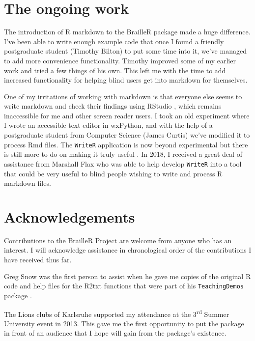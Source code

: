 \documentclass[
]{book}
\begin{document}
\hypertarget{the-ongoing-work}{%
\section{The ongoing work}\label{the-ongoing-work}}

The introduction of R markdown to the BrailleR package made a huge difference.
I've been able to write enough example code that once I found a friendly postgraduate student (Timothy Bilton) to put some time into it, we've managed to add more convenience functionality.
Timothy improved some of my earlier work and tried a few things of his own.
This left me with the time to add increased functionality for helping blind users get into markdown for themselves.

One of my irritations of working with markdown is that everyone else seems to write markdown and check their findings using RStudio \citep{RStudio}, which remains inaccessible for me and other screen reader users. I took an old experiment where I wrote an accessible text editor in wxPython, and with the help of a postgraduate student from Computer Science (James Curtis) we've modified it to process Rmd files.
The \texttt{WriteR} application is now beyond experimental but there is still more to do on making it truly useful \citep{GodfreyCurtis2016WriteRPaper}.
In 2018, I received a great deal of assistance from Marshall Flax who was able to help develop \texttt{WriteR} into a tool that could be very useful to blind people wishing to write and process R markdown files.

\hypertarget{acknowledgements}{%
\section{Acknowledgements}\label{acknowledgements}}

Contributions to the BrailleR Project are welcome from anyone who has an
interest. I will acknowledge assistance in chronological order of the
contributions I have received thus far.

Greg Snow was the first person to assist when he gave me copies of the
original R code and help files for the R2txt functions that were part of
his \texttt{TeachingDemos} package \citep{Rpkg-TeachingDemos}.

The Lions clubs of Karlsruhe supported my attendance at the 3\textsuperscript{rd} Summer
University event in 2013. This gave me the first opportunity to
put the package in front of an audience that I hope will gain from the
package's existence.
\end{document}
